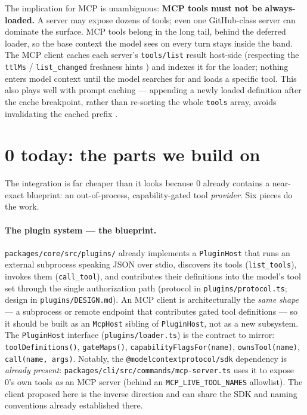 \documentclass[11pt]{article}
\begin{document}
The implication for MCP is unambiguous: \textbf{MCP tools must not be
always-loaded.} A server may expose dozens of tools; even one GitHub-class
server can dominate the surface. MCP tools belong in the long tail, behind the
deferred loader, so the base context the model sees on every turn stays inside
the band. The MCP client caches each server's \texttt{tools/list} result
host-side (respecting the \texttt{ttlMs} / \texttt{list\_changed} freshness
hints \cite{mcp-clientbp}) and indexes it for the loader; nothing enters model
context until the model searches for and loads a specific tool. This also plays
well with prompt caching --- appending a newly loaded definition after the cache
breakpoint, rather than re-sorting the whole \texttt{tools} array, avoids
invalidating the cached prefix \cite{mcp-clientbp}.

\section{0 today: the parts we build on}

The integration is far cheaper than it looks because 0 already contains a
near-exact blueprint: an out-of-process, capability-gated tool \emph{provider}.
Six pieces do the work.

\paragraph{The plugin system --- the blueprint.} \texttt{packages/core/src/plugins/}
already implements a \texttt{PluginHost} that runs an external subprocess
speaking JSON over stdio, discovers its tools (\texttt{list\_tools}), invokes
them (\texttt{call\_tool}), and contributes their definitions into the model's
tool set through the single authorization path (protocol in
\texttt{plugins/protocol.ts}; design in \texttt{plugins/DESIGN.md}). An MCP client
is architecturally the \emph{same shape} --- a subprocess or remote endpoint that
contributes gated tool definitions --- so it should be built as an
\texttt{McpHost} sibling of \texttt{PluginHost}, not as a new subsystem. The
\texttt{PluginHost} interface (\texttt{plugins/loader.ts}) is the contract to
mirror: \texttt{toolDefinitions()}, \texttt{gateMaps()},
\texttt{capabilityFlagsFor(name)}, \texttt{ownsTool(name)},
\texttt{call(name, args)}. Notably, the \texttt{@modelcontextprotocol/sdk}
dependency is \emph{already present}: \texttt{packages/cli/src/commands/mcp-server.ts}
uses it to expose 0's own tools \emph{as} an MCP server (behind an
\texttt{MCP\_LIVE\_TOOL\_NAMES} allowlist). The client proposed here is the
inverse direction and can share the SDK and naming conventions already
established there.
\end{document}
